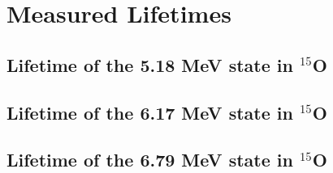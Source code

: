 %
%
%
%
%
%
%
%
%
%


%
%

\chapter{Measured Lifetimes}
\label{chap: lifetime}

\section{Lifetime of the 5.18 MeV state in $^{15}$O}
\label{sec: lifetime518}


\section{Lifetime of the 6.17 MeV state in $^{15}$O}
\label{sec: lifetime617}


\section{Lifetime of the 6.79 MeV state in $^{15}$O}
\label{sec: lifetime679}



%
% 
% 
